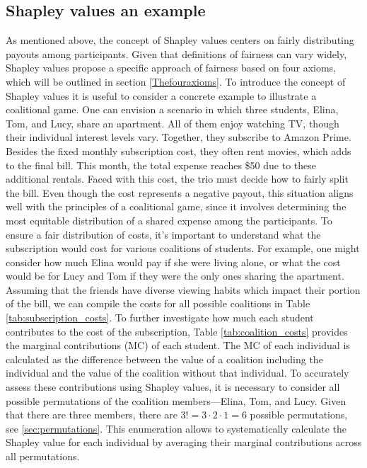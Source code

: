 \documentclass[12pt]{article}
\begin{document}
\subsection{Shapley values an example}
As mentioned above, the concept of Shapley values centers on fairly distributing payouts among participants. Given that definitions of fairness can vary widely, Shapley values propose a specific approach of fairness based on four axioms, which will be outlined in section \ref{Thefouraxioms}.
To introduce the concept of Shapley values it is useful to consider a concrete example to illustrate a coalitional game.
One can envision a scenario in which three students, Elina, Tom, and Lucy, share an apartment. All of them enjoy watching TV, though their individual interest levels vary. Together, they subscribe to Amazon Prime. 
Besides the fixed monthly subscription cost, they often rent movies, which adds to the final bill. This month, the total expense reaches \$50 due to these additional rentals. Faced with this cost, the trio must decide how to fairly split the bill. Even though the cost represents a negative payout, this situation aligns well with the principles of a coalitional game, since it involves determining the most equitable distribution of a shared expense among the participants. To ensure a fair distribution of costs, it's important to understand what the subscription would cost for various coalitions of students. For example, one might consider how much Elina would pay if she were living alone, or what the cost would be for Lucy and Tom if they were the only ones sharing the apartment.
Assuming that the friends have diverse viewing habits which impact their portion of the bill, we can compile the costs for all possible coalitions in Table \ref{tab:subscription_costs}.
To further investigate how much each student contributes to the cost of the subscription, Table \ref{tab:coalition_costs} provides the marginal contributions (MC) of each student.
The MC of each individual is calculated as the difference between the value of a coalition including the individual and the value of the coalition without that individual. To accurately assess these contributions using Shapley values, it is necessary to consider all possible permutations of the coalition members—Elina, Tom, and Lucy. Given that there are three members, there are $ 3! = 3 \cdot2 \cdot1 = 6$ possible permutations, see \ref{sec:permutations}.
This enumeration allows to systematically calculate the Shapley value for each individual by averaging their marginal contributions across all permutations. 
\end{document}

